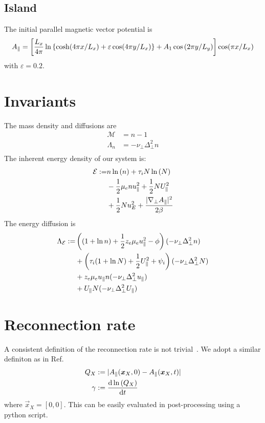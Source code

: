 \subsection{Island}
The initial parallel magnetic vector potential is
\begin{align}
    A_\parallel =\left[ \frac{L_x}{4\pi} \ln \left\{ \cosh( 4\pi x/L_x) + \varepsilon \cos( 4\pi y/L_x)\right\} + A_1\cos{(2 \pi y/L_y)}\right] \cos( \pi x /L_x)
\end{align}
with $\varepsilon = 0.2$.

\section{Invariants}
The mass density and diffusions are
\begin{align}
    \mathcal M &= n-1 \\
     \Lambda_n &= -\nu_\perp \Delta_\perp^2 n  \\
\end{align}
The inherent energy density of our system is:
\begin{align}
 \mathcal{E} := &
                    n  \ln{(\ensuremath{n })}
                  + \tau_i N \ln{( \ensuremath{N})}
                  \nonumber \\
                 &- \frac{1}{2} \mu_e n  u_\parallel^2
                  + \frac{1}{2} N U_\parallel^2
                  \nonumber \\
                 &+\frac{1}{2} N u_E^2
                  + \frac{|\nabla_\perp A_\parallel|^2}{2 \beta}
\end{align}
The energy diffusion is
\begin{align}
    \Lambda_\mathcal{E} :=  &\left( (1+\ln n ) + \frac{1}{2} z_e \mu_e u_\parallel^2 - \phi \right) (-\nu_\perp \Delta_\perp^2 n )
    \nonumber\\
    &+ \left( \tau_i ( 1+\ln N) + \frac{1}{2} U_\parallel^2 + \psi_i\right)(-\nu_\perp \Delta_\perp^2 N)
    \nonumber\\
    &+ z_e\mu_e u_\parallel n  (-\nu_\perp \Delta_\perp^2 u_\parallel)
    \nonumber\\
    &+ U_\parallel N (-\nu_\perp \Delta_\perp^2 U_\parallel)
\end{align}

\section{Reconnection rate}
 A consistent definition of the reconnection rate is not trivial~\cite{comisso16}.
 We adopt a similar definiton as in Ref.~\cite{comisso13}
\begin{align}
 Q_X&:=|  A_\parallel({\boldsymbol{x}}_X, 0)-A_\parallel({\boldsymbol{x}}_X,t) | \\
 \gamma&:= \frac{\mathrm{d} \ln{(Q_X)}}{\mathrm{d} t}
\end{align}
where $\vec{x}_X = [0,0]$.
This can be easily evaluated in post-processing using a python script.

